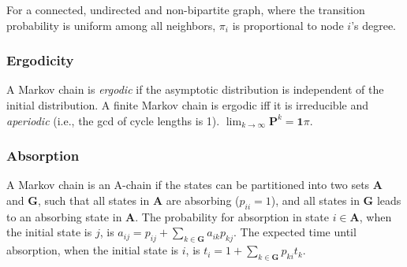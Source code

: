 For a connected, undirected and non-bipartite graph, where the transition probability is uniform among all neighbors, $\pi_i$ is proportional to node $i$'s degree.

\subsubsection{Ergodicity}
A Markov chain is \emph{ergodic} if the asymptotic distribution is independent of the initial distribution.
A finite Markov chain is ergodic iff it is irreducible and \emph{aperiodic} (i.e., the gcd of cycle lengths is 1).
$\lim_{k\rightarrow\infty}\mathbf{P}^k = \mathbf{1}\pi$.

\subsubsection{Absorption}
A Markov chain is an A-chain if the states can be partitioned into two sets $\mathbf{A}$ and $\mathbf{G}$, such that all states in $\mathbf{A}$ are absorbing ($p_{ii}=1$), and all states in $\mathbf{G}$ leads to an absorbing state in $\mathbf{A}$.
The probability for absorption in state $i\in\mathbf{A}$, when the initial state is $j$, is $a_{ij} = p_{ij}+\sum_{k\in\mathbf{G}} a_{ik}p_{kj}$.
The expected time until absorption, when the initial state is $i$, is $t_i = 1+\sum_{k\in\mathbf{G}}p_{ki}t_k$.





